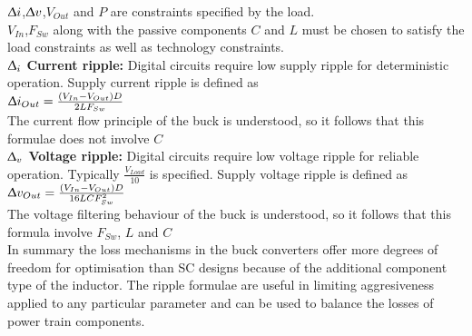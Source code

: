 \documentclass[letterpaper,twocolumn,10pt]{article}
\begin{document}
$\Updelta i$,$\Updelta v$,$V_{Out}$ and $P$ are constraints specified by the load.\\
$V_{In}$,$F_{Sw}$ along with the passive components $C$ and $L$ must be chosen to satisfy the load constraints as well as technology constraints.\\
\textbf{$\Updelta_i$ Current ripple: }Digital circuits require low supply ripple for deterministic operation. Supply current ripple is defined as\\
$\Updelta i_{Out} = \frac{(V_{In} - V_{Out})D}{2LF_{Sw}}$ ~\cite{Kurson2006}\\
The current flow principle of the buck is understood, so it follows that this formulae does not involve $C$\\
\textbf{$\Updelta_v$ Voltage ripple: }Digital circuits require low voltage ripple for reliable operation. Typically $\frac{V_{Load}}{10}$ is specified. Supply voltage ripple is defined as\\
$\Updelta v_{Out} = \frac{(V_{In} - V_{Out})D}{16LCF_{Sw}^2}$ ~\cite{Kurson2006}\\
The voltage filtering behaviour of the buck is understood, so it follows that this formula involve $F_{Sw}$, $L$ and $C$\\

\indent In summary the loss mechanisms in the buck converters offer more degrees of freedom for optimisation than SC designs because of the additional component type of the inductor. The ripple formulae are useful in limiting aggresiveness applied to any particular parameter and can be used to balance the losses of power train components.
\end{document}
